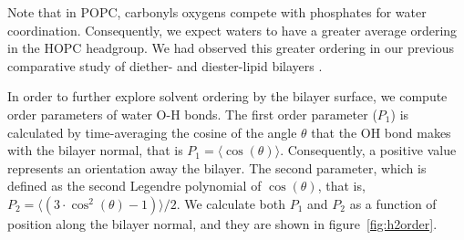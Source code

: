 \documentclass[12pt,openany,final]{book}
\begin{document}
Note that in POPC, carbonyls oxygens compete with phosphates for water coordination. Consequently, we expect waters 
to have a greater average ordering in the HOPC headgroup. We had observed this greater ordering in our previous comparative study of 
diether- and diester-lipid bilayers \cite{kruczek:2017:ether}. 


In order to further explore solvent ordering by the bilayer surface, we compute order parameters of water O-H bonds.
The first order parameter ($P_1$) is calculated by time-averaging the cosine of 
the angle $\theta$ that the OH bond makes with the bilayer normal, 
that is $P_1 = \langle \cos(\theta) \rangle$. Consequently, a positive value represents an orientation 
away the bilayer. The second parameter, which is defined as the second Legendre polynomial of $\cos(\theta)$, that 
is, $P_2 = \langle (3 \cdot \cos^{2}(\theta)-1) \rangle/2$.  
We calculate both $P_1$ and $P_2$ as a function of position along the bilayer normal, and they are shown in figure~\ref{fig:h2order}. 
\end{document}
